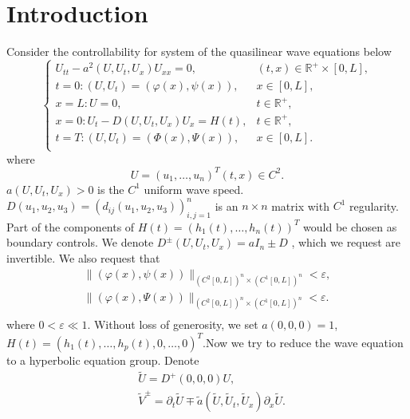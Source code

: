 \documentclass[a4paper,reqno,11pt]{amsart}
\numberwithin{equation}{section} %
\begin{document}
\section{Introduction}\label{intro sec}
Consider the controllability for system of the quasilinear wave equations below
\begin{equation}\label{42}
    \begin{cases}
	U_{tt}-a^2\left( U,U_t,U_x \right) U_{xx}=0,&		\left( t,x \right) \in \mathbb{R}^+\times \left[ 0,L \right] ,\\
	t=0:\left( U,U_t \right) =\left( \varphi  \left( x \right) ,\psi \left( x \right) \right) ,&		x\in \left[ 0,L \right] ,\\
	x=L:U=0,&		t\in \mathbb{R}^+,\\
	x=0:U_t-D\left( U,U_t,U_x \right) U_x=H\left( t \right) ,&		t\in \mathbb{R}^+,\\
	t=T:\left( U,U_t \right) =\left( \varPhi   \left( x \right) ,\varPsi  \left( x \right) \right) ,&		x\in \left[ 0,L \right] .\\
\end{cases}
\end{equation}
where
$$
U=\left(u_1, \ldots, u_n\right)^T(t, x) \in C^2 .
$$
$a\left(U, U_t, U_x\right)>0$ is the $C^1$ uniform wave speed. $D\left(u_1, u_2, u_3\right)=\left(d_{i j}\left(u_1, u_2, u_3\right)\right)_{i, j=1}^n$ is an   $n \times n$ matrix with $C^1$ regularity. Part of the components of $H(t)=\left(h_1(t), \ldots, h_n(t)\right)^T$ would be chosen as boundary controls. We denote $D^{\pm}\left( U,U_t,U_x \right) =a I_n \pm D $ , which we request are invertible. We also request that
$$
\begin{aligned}
	\lVert \left( \varphi  \left( x \right) ,\psi \left( x \right) \right) \rVert _{\left( C^2\left[ 0,L \right] \right) ^n\times \left( C^1\left[ 0,L \right] \right) ^n}  < \varepsilon ,\\
	\lVert \left( \varphi  \left( x \right) ,\Psi \left( x \right) \right) \rVert _{\left( C^2\left[ 0,L \right] \right) ^n\times \left( C^1\left[ 0,L \right] \right) ^n}  < \varepsilon .\\
\end{aligned}
$$
where $0 < \varepsilon \ll 1$.
Without loss of generosity, we set $a(0,0,0)=1$, \ $H(t)=\left(h_1(t), \ldots, h_p(t), 0, \ldots, 0\right)^T$.Now we try to reduce the wave equation to a hyperbolic equation group. Denote
$$
\begin{aligned}
& \tilde{U}=D^{+}(0,0,0) U ,\\
& \tilde{V}^{\pm}=\partial_t \tilde{U} \mp \tilde{a} \left(\tilde{U}, \tilde{U}_t, \tilde{U}_x\right) \partial_x \tilde{U}.
\end{aligned}
$$
\end{document}
